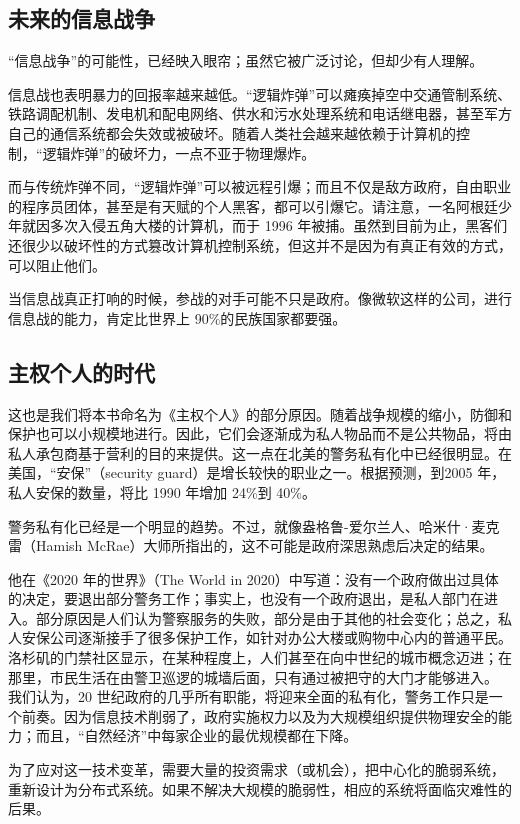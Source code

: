 \subsection{未来的信息战争}
“信息战争”的可能性，已经映入眼帘；虽然它被广泛讨论，但却少有人理解。

信息战也表明暴力的回报率越来越低。“逻辑炸弹”可以瘫痪掉空中交通管制系统、铁路调配机制、发电机和配电网络、供水和污水处理系统和电话继电器，甚至军方自己的通信系统都会失效或被破坏。随着人类社会越来越依赖于计算机的控制，“逻辑炸弹”的破坏力，一点不亚于物理爆炸。

而与传统炸弹不同，“逻辑炸弹”可以被远程引爆；而且不仅是敌方政府，自由职业的程序员团体，甚至是有天赋的个人黑客，都可以引爆它。请注意，一名阿根廷少年就因多次入侵五角大楼的计算机，而于 1996 年被捕。虽然到目前为止，黑客们还很少以破坏性的方式篡改计算机控制系统，但这并不是因为有真正有效的方式，可以阻止他们。

当信息战真正打响的时候，参战的对手可能不只是政府。像微软这样的公司，进行信息战的能力，肯定比世界上 90\%的民族国家都要强。

\subsection{主权个人的时代}
这也是我们将本书命名为《主权个人》的部分原因。随着战争规模的缩小，防御和保护也可以小规模地进行。因此，它们会逐渐成为私人物品而不是公共物品，将由私人承包商基于营利的目的来提供。这一点在北美的警务私有化中已经很明显。在美国，“安保”（security guard）是增长较快的职业之一。根据预测，到2005 年，私人安保的数量，将比 1990 年增加 24\%到 40\%。

警务私有化已经是一个明显的趋势。不过，就像盎格鲁-爱尔兰人、哈米什·麦克雷（Hamish McRae）大师所指出的，这不可能是政府深思熟虑后决定的结果。

他在《2020 年的世界》（The World in 2020）中写道：没有一个政府做出过具体的决定，要退出部分警务工作；事实上，也没有一个政府退出，是私人部门在进入。部分原因是人们认为警察服务的失败，部分是由于其他的社会变化；总之，私人安保公司逐渐接手了很多保护工作，如针对办公大楼或购物中心内的普通平民。洛杉矶的门禁社区显示，在某种程度上，人们甚至在向中世纪的城市概念迈进；在那里，市民生活在由警卫巡逻的城墙后面，只有通过被把守的大门才能够进入。 我们认为，20 世纪政府的几乎所有职能，将迎来全面的私有化，警务工作只是一个前奏。因为信息技术削弱了，政府实施权力以及为大规模组织提供物理安全的能力；而且，“自然经济”中每家企业的最优规模都在下降。

为了应对这一技术变革，需要大量的投资需求（或机会），把中心化的脆弱系统，重新设计为分布式系统。如果不解决大规模的脆弱性，相应的系统将面临灾难性的后果。


